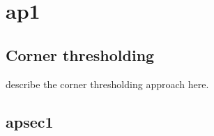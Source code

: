 \chapter{ap1}
\section{Corner thresholding}
\label{sec:corner_thresholding}
describe the corner thresholding approach here.
\section{apsec1}